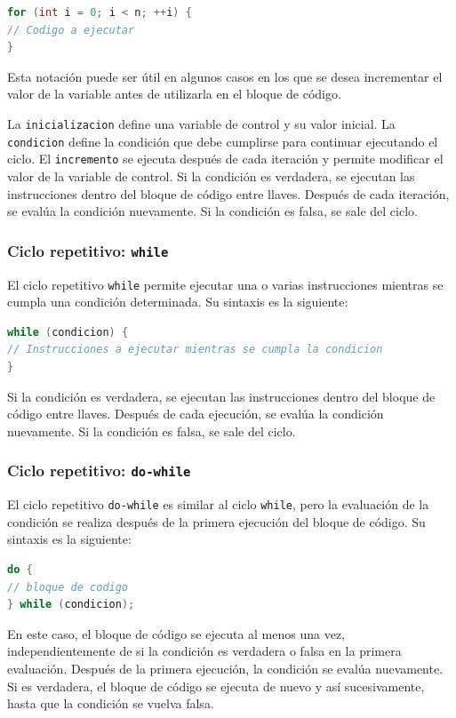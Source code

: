 \documentclass[executivepaper]{article}
\begin{document}
\begin{lstlisting}[language=Java]
for (int i = 0; i < n; ++i) {
// Codigo a ejecutar
}
\end{lstlisting}
Esta notación puede ser útil en algunos casos en los que se desea incrementar el valor de la variable antes de utilizarla en el bloque de código.

La \texttt{inicializacion} define una variable de control y su valor inicial. La \texttt{condicion} define la condición que debe cumplirse para continuar ejecutando el ciclo. El \texttt{incremento} se ejecuta después de cada iteración y permite modificar el valor de la variable de control. Si la condición es verdadera, se ejecutan las instrucciones dentro del bloque de código entre llaves. Después de cada iteración, se evalúa la condición nuevamente. Si la condición es falsa, se sale del ciclo.

\subsubsection{Ciclo repetitivo: \texttt{while}}

El ciclo repetitivo \texttt{while} permite ejecutar una o varias instrucciones mientras se cumpla una condición determinada. Su sintaxis es la siguiente:

\begin{lstlisting}[language=Java]
while (condicion) {
// Instrucciones a ejecutar mientras se cumpla la condicion
}
\end{lstlisting}

Si la condición es verdadera, se ejecutan las instrucciones dentro del bloque de código entre llaves. Después de cada ejecución, se evalúa la condición nuevamente. Si la condición es falsa, se sale del ciclo.

\subsubsection{Ciclo repetitivo: \texttt{do-while}}

El ciclo repetitivo \texttt{do-while} es similar al ciclo \texttt{while}, pero la evaluación de la condición se realiza después de la primera ejecución del bloque de código. Su sintaxis es la siguiente:

\begin{lstlisting}[language=Java]
do {
// bloque de codigo
} while (condicion);
\end{lstlisting}
    
    En este caso, el bloque de código se ejecuta al menos una vez, independientemente de si la condición es verdadera o falsa en la primera evaluación. Después de la primera ejecución, la condición se evalúa nuevamente. Si es verdadera, el bloque de código se ejecuta de nuevo y así sucesivamente, hasta que la condición se vuelva falsa.
\end{document}
